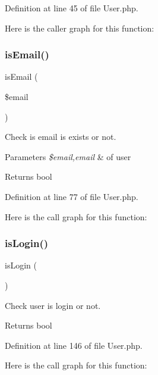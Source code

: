Definition at line 45 of file User.\+php.

Here is the caller graph for this function\+:
\mbox{\label{class_zest_1_1_auth_1_1_user_a06e51d64ebd5861dc7728adf64a226d7}} 
\subsubsection{\texorpdfstring{is\+Email()}{isEmail()}}
{\footnotesize\ttfamily is\+Email (\begin{DoxyParamCaption}\item[{}]{\$email }\end{DoxyParamCaption})}

Check is email is exists or not.


\begin{DoxyParams}{Parameters}
{\em \$email,email} & of user\\
\hline
\end{DoxyParams}
\begin{DoxyReturn}{Returns}
bool 
\end{DoxyReturn}


Definition at line 77 of file User.\+php.

Here is the call graph for this function\+:
\mbox{\label{class_zest_1_1_auth_1_1_user_a143c83afc39f4761088db46dc2c9426e}} 
\subsubsection{\texorpdfstring{is\+Login()}{isLogin()}}
{\footnotesize\ttfamily is\+Login (\begin{DoxyParamCaption}{ }\end{DoxyParamCaption})}

Check user is login or not.

\begin{DoxyReturn}{Returns}
bool 
\end{DoxyReturn}


Definition at line 146 of file User.\+php.

Here is the call graph for this function\+:
\mbox{\label{class_zest_1_1_auth_1_1_user_a5d20a1de4d92b051e389fa8579cb6b07}} 

